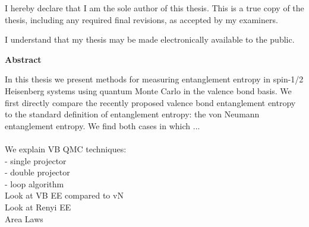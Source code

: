 \cleardoublepage %
 


  \noindent
I hereby declare that I am the sole author of this thesis. This is a true copy of the thesis, including any required final revisions, as accepted by my examiners.

  \bigskip
  
  \noindent
I understand that my thesis may be made electronically available to the public.

\cleardoublepage


\begin{center}\textbf{Abstract}\end{center}

In this thesis we present methods for measuring entanglement entropy in spin-1/2 Heisenberg systems using quantum Monte Carlo 
in the valence bond basis.  We first directly compare the recently proposed valence bond entanglement entropy to the standard definition
of entanglement entropy: the von Neumann entanglement entropy.  We find both cases in which ...\\\\
We explain VB QMC techniques:\\
 - single projector\\
 - double projector\\
 - loop algorithm\\
Look at VB EE compared to vN\\
Look at Renyi EE\\
Area Laws\\

\cleardoublepage



